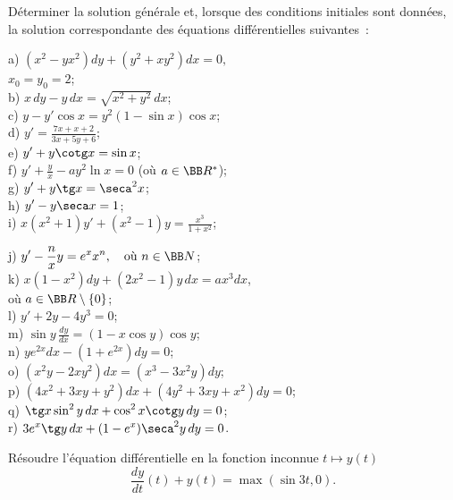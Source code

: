 \documentclass[12pt,french,oneside,a4paper]{memoir} %
\begin{document}
\begin{exo}
Déterminer la solution générale et, lorsque des conditions
initiales sont données, la solution correspondante des
équations différentielles suivantes~:\\[2mm]
\hfill
\begin{minipage}[t]{8cm}
a) $\displaystyle{(x^2-yx^2)dy+(y^2+xy^2)dx=0},$\\[2mm]\phantom{a) }
$x_0=y_0=2$;\\[2mm] 
b) $\displaystyle{x\,dy-y\,dx=\sqrt{x^2+y^2}\,dx}$;\\[2mm] 
c) $\displaystyle{y-y'\cos x=y^2(1-\sin x)\cos x}$;\\[2mm] 
d) $\displaystyle{y'=\frac{7x+x+2}{3x+5y+6}}$;\\[2mm] 
e) $\displaystyle{y'+y\cotg x=\sin x}$;\\[2mm] 
f) $\displaystyle{y'+\frac{y}{x}-ay^2\ln x=0}$ (où $a\in\BB R^*$);\\[2mm]
g) $\displaystyle{y'+y\tg x=\seca^2x}$;\\[2mm] 
h) $\displaystyle{y'-y\seca x=1}$;\\[2mm] 
i) $\displaystyle{x(x^2+1)y'+(x^2-1)y=\frac{x^3}{1+x^2}}$;
\end{minipage} 
\hfill \begin{minipage}[t]{8cm}
j) $\displaystyle{y'-\frac{n}{x}y=e^xx^n,\quad\mbox{où }n\in\BB
N}$;\\[2mm]
k) $\displaystyle{x(1-x^2)dy+(2x^2-1)y\,dx=ax^3dx}$,\\
où $a\in\BB R\setminus\{0\}$;\\[2mm] 
l) $\displaystyle{y'+2y-4y^3=0}$;\\[2mm] m) $\displaystyle{\sin
y\,\frac{dy}{dx}=(1-x\cos y)\cos y}$;\\[2mm] 
n)
$\displaystyle{ye^{2x}dx-(1+e^{2x})dy=0}$;\\[2mm] 
o)
$\displaystyle{(x^2y-2xy^2)dx=(x^3-3x^2y)dy}$;\\[2mm] 
p)
$\displaystyle{(4x^2+3xy+y^2)dx+(4y^2+3xy+x^2)dy=0}$;\\[2mm] 
q)
$\displaystyle{\tg x\sin^2y\,dx+\cos^2x\cotg y\,dy=0}$;\\[2mm] 
r)
$\displaystyle{3e^x\tg y\,dx+(1-e^x)\seca^2y\,dy=0}$.
\end{minipage} \hfill
\end{exo}
\begin{exo}
Résoudre l'équation différentielle en la fonction
inconnue $t\mapsto y(t)$
\begin{equation*}
\frac{dy}{dt}(t)+y(t)=\max(\sin 3t,0).
\end{equation*}
\end{exo}
\end{document}

